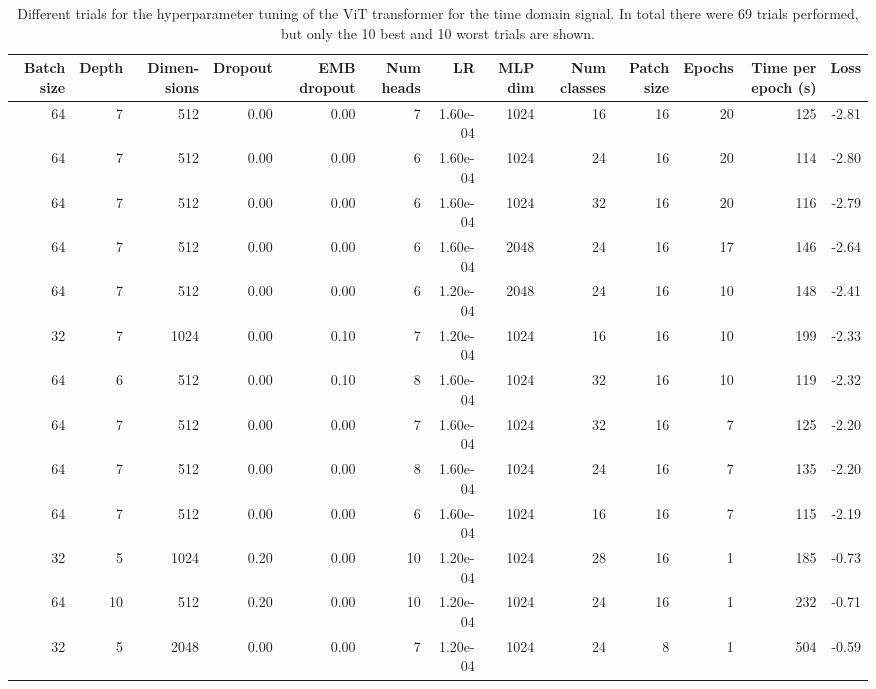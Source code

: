 \begin{appendices}
\begin{table}
\caption{Different trials for the hyperparameter tuning of the ViT transformer for the time domain signal. In total there were 69 trials performed, but only the 10 best and 10 worst trials are shown.}
\label{tab:hyperparams_vit_t}
\begin{tabular}{rrrrrrrrrrrrr}
\toprule
\multicolumn{1}{p{0.5cm}}{\raggedleft Batch size} & 
\multicolumn{1}{p{0.5cm}}{\raggedleft Depth} & 
\multicolumn{1}{p{1.0cm}}{\raggedleft Dimen-sions} & 
\multicolumn{1}{p{1.0cm}}{\raggedleft Dropout} & 
\multicolumn{1}{p{1.0cm}}{\raggedleft EMB dropout} & 
\multicolumn{1}{p{1.0cm}}{\raggedleft Num heads} & 
\multicolumn{1}{p{0.5cm}}{\raggedleft LR} & 
\multicolumn{1}{p{0.5cm}}{\raggedleft MLP dim} & 
\multicolumn{1}{p{1.0cm}}{\raggedleft Num classes} & 
\multicolumn{1}{p{1.0cm}}{\raggedleft Patch size} & 
\multicolumn{1}{p{1.0cm}}{\raggedleft Epochs} & 
\multicolumn{1}{p{1.5cm}}{\raggedleft Time per epoch (s)} & 
\multicolumn{1}{p{0.5cm}}{\raggedleft Loss} \\
\midrule
64 & 7 & 512 & 0.00 & 0.00 & 7 & 1.60e-04 & 1024 & 16 & 16 & 20 & 125 & -2.81 \\
64 & 7 & 512 & 0.00 & 0.00 & 6 & 1.60e-04 & 1024 & 24 & 16 & 20 & 114 & -2.80 \\
64 & 7 & 512 & 0.00 & 0.00 & 6 & 1.60e-04 & 1024 & 32 & 16 & 20 & 116 & -2.79 \\
64 & 7 & 512 & 0.00 & 0.00 & 6 & 1.60e-04 & 2048 & 24 & 16 & 17 & 146 & -2.64 \\
64 & 7 & 512 & 0.00 & 0.00 & 6 & 1.20e-04 & 2048 & 24 & 16 & 10 & 148 & -2.41 \\
32 & 7 & 1024 & 0.00 & 0.10 & 7 & 1.20e-04 & 1024 & 16 & 16 & 10 & 199 & -2.33 \\
64 & 6 & 512 & 0.00 & 0.10 & 8 & 1.60e-04 & 1024 & 32 & 16 & 10 & 119 & -2.32 \\
64 & 7 & 512 & 0.00 & 0.00 & 7 & 1.60e-04 & 1024 & 32 & 16 & 7 & 125 & -2.20 \\
64 & 7 & 512 & 0.00 & 0.00 & 8 & 1.60e-04 & 1024 & 24 & 16 & 7 & 135 & -2.20 \\
64 & 7 & 512 & 0.00 & 0.00 & 6 & 1.60e-04 & 1024 & 16 & 16 & 7 & 115 & -2.19 \\
\midrule
32 & 5 & 1024 & 0.20 & 0.00 & 10 & 1.20e-04 & 1024 & 28 & 16 & 1 & 185 & -0.73 \\
64 & 10 & 512 & 0.20 & 0.00 & 10 & 1.20e-04 & 1024 & 24 & 16 & 1 & 232 & -0.71 \\
32 & 5 & 2048 & 0.00 & 0.00 & 7 & 1.20e-04 & 1024 & 24 & 8 & 1 & 504 & -0.59 \\

\end{tabular}
\end{table}
\end{appendices}
